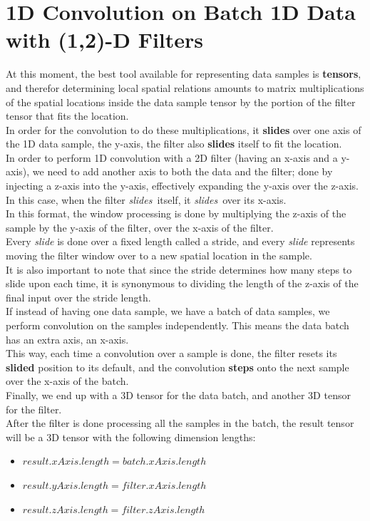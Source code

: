 \documentclass[a4paper, 12pt]{report}
\begin{document}
\section{\textbf{1D Convolution on Batch 1D Data with (1,2)-D Filters}}
At this moment, the best tool available for representing data samples is \textbf{tensors}, and therefor determining local spatial relations amounts to matrix multiplications of the spatial locations inside the data sample tensor by the portion of the filter tensor that fits the location.\\
In order for the convolution to do these multiplications, it \textbf{slides} over one axis of the 1D data sample, the y-axis, the filter also \textbf{slides} itself to fit the location.\\
In order to perform 1D convolution with a 2D filter (having an x-axis and a y-axis), we need to add another axis to both the data and the filter; done by injecting a z-axis into the y-axis, effectively expanding the y-axis over the z-axis. In this case, when the filter \textit{slides}~itself, it \textit{slides}~over its x-axis.\\
In this format, the window processing is done by multiplying the z-axis of the sample by the y-axis of the filter, over the x-axis of the filter.\\
Every \textit{slide} is done over a fixed length called a stride, and every \textit{slide} represents moving the filter window over to a new spatial location in the sample.\\
It is also important to note that since the stride determines how many steps to slide upon each time, it is synonymous to dividing the length of the z-axis of the final input over the stride length.\\
If instead of having one data sample, we have a batch of data samples, we perform convolution on the samples independently. This means the data batch has an extra axis, an x-axis.\\
This way, each time a convolution over a sample is done, the filter resets its \textbf{slided} position to its default, and the convolution \textbf{steps} onto the next sample over the x-axis of the batch.\\
Finally, we end up with a 3D tensor for the data batch, and another 3D tensor for the filter.\\
After the filter is done processing all the samples in the batch, the result tensor will be a 3D tensor with the following dimension lengths:
\begin{itemize}[nosep]
	\item $ result.xAxis.length = batch.xAxis.length $
	\item $ result.yAxis.length = filter.xAxis.length $
	\item $ result.zAxis.length = filter.zAxis.length $
\end{itemize}
\end{document}
